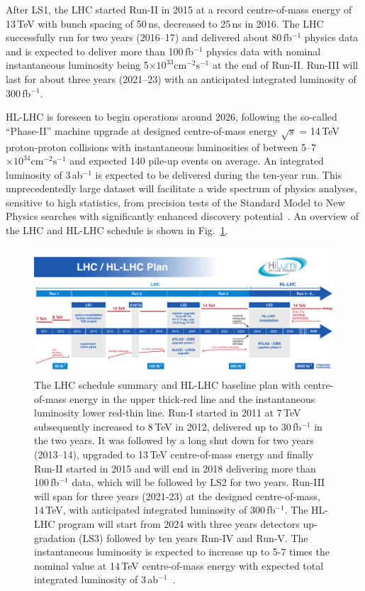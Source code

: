 After LS1, the LHC started Run-II in 2015 at a record centre-of-mass energy of 13\,TeV with bunch spacing of 50\,ns, decreased to 25\,ns in 2016. The LHC successfully run for two years (2016–17) and delivered about 80\,fb$^{-1}$ physics data and is expected to deliver more than 100\,fb$^{-1}$ physics data with nominal instantaneous luminosity being 5$\times 10^{33}\text{cm}^{-2}\text{s}^{-1}$ at the end of Run-II. Run-III will last for about three years (2021–23) with an anticipated integrated luminosity of 300\,fb$^{-1}$.

HL-LHC is foreseen to begin operations around 2026, following the so-called ``Phase-II” machine upgrade at designed centre-of-mass energy $\sqrt{s}$ = 14\,TeV proton-proton collisions with instantaneous luminosities of between 5–7$\times 10^{34}\text{cm}^{-2}\text{s}^{-1}$ and expected 140 pile-up events on average. An integrated luminosity of 3\,ab$^{-1}$ is expected to be delivered during the ten-year run. This unprecedentedly large dataset will facilitate a wide spectrum of physics analyses, sensitive to high statistics, from precision tests of the Standard Model to New Physics searches with significantly enhanced discovery potential~\cite{1742-6596-515-1-012012}. An overview of the LHC and HL-LHC schedule is shown in Fig.~\ref{fig:hl_lhc_program}. 
 \begin{figure}[h]
\centering
\includegraphics[scale=0.52]{fig/lhc/HL-LHC-plan-2016-Plan-1}
\caption{\label{fig:hl_lhc_program} The LHC schedule summary and HL-LHC baseline plan with centre-of-mass energy in the upper thick-red line and the instantaneous luminosity lower red-thin line. Run-I started in 2011 at 7\,TeV subsequently increased to 8\,TeV in 2012, delivered up to 30\,fb$^{-1}$ in the two years. It was followed by a long shut down for two years (2013–14), upgraded to 13\,TeV centre-of-mass energy and finally Run-II started in 2015 and will end in 2018 delivering more than 100\,fb$^{-1}$ data, which will be followed by LS2 for two years. Run-III will span for three years (2021-23) at the designed centre-of-mass, 14\,TeV, with anticipated integrated luminosity of 300\,fb$^{-1}$. The HL-LHC program will start from 2024 with three years detectors up-gradation (LS3) followed by ten years Run-IV and Run-V. The instantaneous luminosity is expected to increase up to 5-7 times the nominal value at 14\,TeV centre-of-mass energy with expected total integrated luminosity of 3\,ab$^{-1}$~\cite{hl_lhc_industry}.}
\end{figure} 

